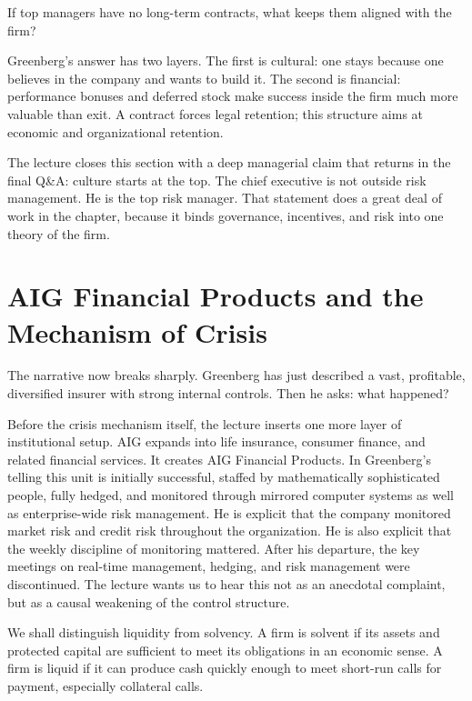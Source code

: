 If top managers have no long-term contracts, what keeps them aligned with the firm?

Greenberg's answer has two layers. The first is cultural: one stays because one believes in the company and wants to build it. The second is financial: performance bonuses and deferred stock make success inside the firm much more valuable than exit. A contract forces legal retention; this structure aims at economic and organizational retention.

The lecture closes this section with a deep managerial claim that returns in the final Q\&A: culture starts at the top. The chief executive is not outside risk management. He is the top risk manager. That statement does a great deal of work in the chapter, because it binds governance, incentives, and risk into one theory of the firm.

\section{AIG Financial Products and the Mechanism of Crisis}

The narrative now breaks sharply. Greenberg has just described a vast, profitable, diversified insurer with strong internal controls. Then he asks: what happened?

Before the crisis mechanism itself, the lecture inserts one more layer of institutional setup. AIG expands into life insurance, consumer finance, and related financial services. It creates AIG Financial Products. In Greenberg's telling this unit is initially successful, staffed by mathematically sophisticated people, fully hedged, and monitored through mirrored computer systems as well as enterprise-wide risk management. He is explicit that the company monitored market risk and credit risk throughout the organization. He is also explicit that the weekly discipline of monitoring mattered. After his departure, the key meetings on real-time management, hedging, and risk management were discontinued. The lecture wants us to hear this not as an anecdotal complaint, but as a causal weakening of the control structure.

\begin{definition}
We shall distinguish liquidity from solvency. A firm is solvent if its assets and protected capital are sufficient to meet its obligations in an economic sense. A firm is liquid if it can produce cash quickly enough to meet short-run calls for payment, especially collateral calls.
\end{definition}

